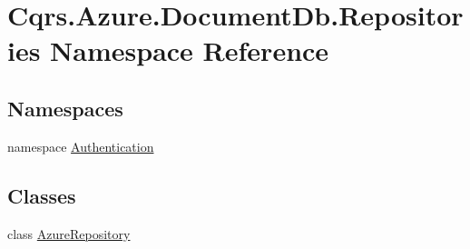 \hypertarget{namespaceCqrs_1_1Azure_1_1DocumentDb_1_1Repositories}{}\section{Cqrs.\+Azure.\+Document\+Db.\+Repositories Namespace Reference}
\label{namespaceCqrs_1_1Azure_1_1DocumentDb_1_1Repositories}
\subsection*{Namespaces}
\begin{DoxyCompactItemize}
\item 
namespace \hyperlink{namespaceCqrs_1_1Azure_1_1DocumentDb_1_1Repositories_1_1Authentication}{Authentication}
\end{DoxyCompactItemize}
\subsection*{Classes}
\begin{DoxyCompactItemize}
\item 
class \hyperlink{classCqrs_1_1Azure_1_1DocumentDb_1_1Repositories_1_1AzureRepository}{Azure\+Repository}
\end{DoxyCompactItemize}
